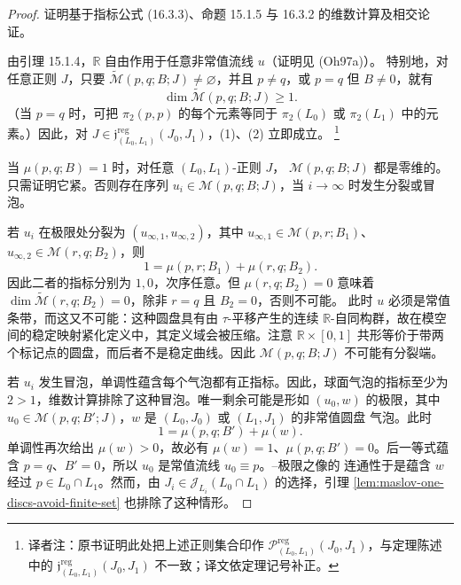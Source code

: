 \begin{proof}
证明基于指标公式 (16.3.3)、命题 15.1.5 与 16.3.2 的维数计算及相交论证。

由引理 15.1.4，$\mathbb R$ 自由作用于任意非常值流线 $u$（证明见 (Oh97a)）。
特别地，对任意\personFredholm{}正则 $J$，只要
$\widetilde{\mathcal M}(p,q;B;J)\neq\varnothing$，并且 $p\neq q$，或 $p=q$ 但
$B\neq0$，就有
\[
 \dim\widetilde{\mathcal M}(p,q;B;J)\geq1.
\]
（当 $p=q$ 时，可把 $\pi_2(p,p)$ 的每个元素等同于 $\pi_2(L_0)$ 或
$\pi_2(L_1)$ 中的元素。）因此，对
$J\in\mathfrak j^{\mathrm{reg}}_{(L_0,L_1)}(J_0,J_1)$，(1)、(2) 立即成立。
\footnote{译者注：原书证明此处把上述正则集合印作
$\mathcal P^{\mathrm{reg}}_{(L_0,L_1)}(J_0,J_1)$，与定理陈述中的
$\mathfrak j^{\mathrm{reg}}_{(L_0,L_1)}(J_0,J_1)$ 不一致；译文依定理记号补正。}

当 $\mu(p,q;B)=1$ 时，对任意 $(L_0,L_1)$-正则 $J$，
$\mathcal M(p,q;B;J)$ 都是零维的。只需证明它紧。否则存在序列
$u_i\in\mathcal M(p,q;B;J)$，当 $i\to\infty$ 时发生分裂或冒泡。

若 $u_i$ 在极限处分裂为 $(u_{\infty,1},u_{\infty,2})$，其中
$u_{\infty,1}\in\mathcal M(p,r;B_1)$、
$u_{\infty,2}\in\mathcal M(r,q;B_2)$，则
\[
 1=\mu(p,r;B_1)+\mu(r,q;B_2).
\]
因此二者的指标分别为 $1,0$，次序任意。但 $\mu(r,q;B_2)=0$ 意味着
$\dim\widetilde{\mathcal M}(r,q;B_2)=0$，除非 $r=q$ 且 $B_2=0$，否则不可能。
此时 $u$ 必须是常值条带，而这又不可能：这种圆盘具有由 $\tau$-平移产生的连续
$\mathbb R$-自同构群，故在模空间的稳定映射紧化定义中，其定义域会被压缩。注意
$\mathbb R\times[0,1]$ 共形等价于带两个标记点的圆盘，而后者不是稳定曲线。因此
$\mathcal M(p,q;B;J)$ 不可能有分裂端。

若 $u_i$ 发生冒泡，单调性蕴含每个气泡都有正指标。因此，球面气泡的指标至少为
$2>1$，维数计算排除了这种冒泡。唯一剩余可能是形如 $(u_0,w)$ 的极限，其中
$u_0\in\mathcal M(p,q;B';J)$，$w$ 是 $(L_0,J_0)$ 或 $(L_1,J_1)$ 的非常值圆盘
气泡。此时
\[
 1=\mu(p,q;B')+\mu(w).
\]
单调性再次给出 $\mu(w)>0$，故必有 $\mu(w)=1$、$\mu(p,q;B')=0$。后一等式蕴含
$p=q$、$B'=0$，所以 $u_0$ 是常值流线 $u_0\equiv p$。\personGromov{}--\personFloer{}极限之像的
连通性于是蕴含 $w$ 经过 $p\in L_0\cap L_1$。然而，由
$J_i\in\mathcal J_{L_i}(L_0\cap L_1)$ 的选择，引理
\ref{lem:maslov-one-discs-avoid-finite-set} 也排除了这种情形。
\end{proof}

